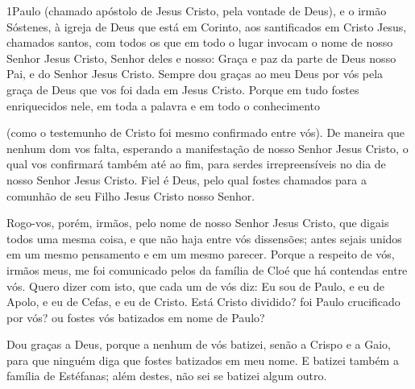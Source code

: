 
\lettrine{1} Paulo (chamado apóstolo de Jesus Cristo, pela
vontade de Deus), e o irmão Sóstenes, à igreja de Deus que está
em Corinto, aos santificados em Cristo Jesus, chamados santos, com
todos os que em todo o lugar invocam o nome de nosso Senhor Jesus
Cristo, Senhor deles e nosso: Graça e paz da parte de Deus nosso
Pai, e do Senhor Jesus Cristo. Sempre dou graças ao meu Deus por
vós pela graça de Deus que vos foi dada em Jesus Cristo. Porque
em tudo fostes enriquecidos nele, em toda a palavra e em todo o
conhecimento

 (como o testemunho de Cristo foi mesmo confirmado entre vós).
De maneira que nenhum dom vos falta, esperando a manifestação de
nosso Senhor Jesus Cristo, o qual vos confirmará também até ao
fim, para serdes irrepreensíveis no dia de nosso Senhor Jesus
Cristo. Fiel é Deus, pelo qual fostes chamados para a comunhão
de seu Filho Jesus Cristo nosso Senhor.

Rogo-vos, porém, irmãos, pelo nome de nosso Senhor Jesus Cristo,
que digais todos uma mesma coisa, e que não haja entre vós
dissensões; antes sejais unidos em um mesmo pensamento e em um mesmo
parecer. Porque a respeito de vós, irmãos meus, me foi
comunicado pelos da família de Cloé que há contendas entre vós.
Quero dizer com isto, que cada um de vós diz: Eu sou de
Paulo, e eu de Apolo, e eu de Cefas, e eu de Cristo. Está
Cristo dividido? foi Paulo crucificado por vós? ou fostes vós
batizados em nome de Paulo?

Dou graças a Deus, porque a nenhum de vós batizei, senão a Crispo
e a Gaio, para que ninguém diga que fostes batizados em meu
nome. E batizei também a família de Estéfanas; além destes,
não sei se batizei algum outro.

